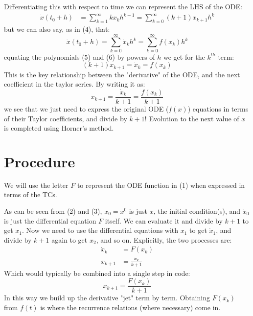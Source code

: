 \documentclass[11pt]{article}
\begin{document}
Differentiating this with respect to time we can represent the LHS of the ODE:
\begin{equation}
\begin{aligned}
\dot{x}(t_0 + h) &= \sum_{k=1}^{\infty} k x_kh^{k-1} = \sum_{k=0}^{\infty} (k + 1) x_{k+1}h^k
\end{aligned}
\end{equation}
but we can also say, as in (4), that:
\begin{equation}
\dot{x}(t_0 + h) = \sum_{k=0}^{\infty} \dot{x}_kh^k = \sum_{k=0}^{\infty} f({x}_k)h^k
\end{equation}
equating the polynomials (5) and (6) by powers of $h$ we get for the $k^{th}$ term:
\begin{equation}
(k + 1) x_{k+1} = \dot{x}_k = f(x_k)
\end{equation}
This is the key relationship between the "derivative" of the ODE, and the next coefficient in the taylor series.
By writing it as:
\begin{equation}
x_{k+1} = \frac{\dot{x}_k} {k + 1} = \frac{f({x}_k)} {k + 1}
\end{equation}
we see that we just need to express the original ODE ($f(x)$) equations in terms of their Taylor coefficients, and divide by $k + 1$!
Evolution to the next value of $x$ is completed using Horner's method.
\section{Procedure}
We will use the letter $F$ to represent the ODE function in (1) when expressed in terms of the TCs.

As can be seen from (2) and (3), $x_0 = x^0$ is just $x$, the initial condition(s), and $\dot{x}_0$ is just the differential equation $F$ itself.
We can evaluate it and divide by $k + 1$ to get $x_1$.
Now we need to use the differential equations with $x_1$ to get $\dot{x}_1$, and divide by $k + 1$ again to get $x_2$, and so on.  Explicitly, the two processes are:
\begin{equation}
\begin{aligned}
\dot{x}_k &= F(x_k) \\
x_{k+1} &= \frac{\dot{x}_k} {k + 1}
\end{aligned}
\end{equation}
Which would typically be combined into a single step in code:
\begin{equation}
x_{k+1} = \frac{F(x_k)} {k + 1}
\end{equation}
In this way we build up the derivative "jet" term by term.
Obtaining $F(x_k)$ from $f(t)$ is where the recurrence relations (where necessary) come in.
\end{document}
